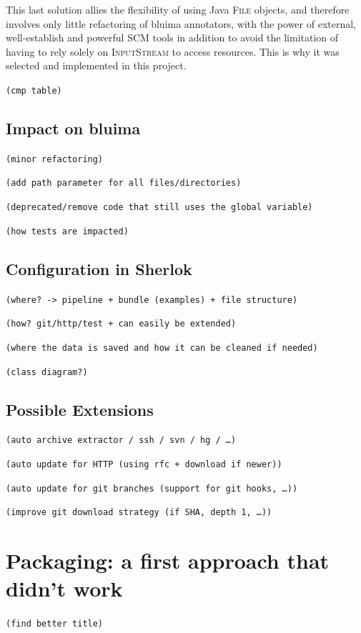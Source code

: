 \documentclass{article}
\newcommand{\ID}[1]{{\textsc{#1}}}
\newcommand{\TODO}[1]{\texttt{\textcolor{YellowOrange}{(#1)}}} %
\begin{document}
This last solution allies the flexibility of using Java \ID{File} objects, and therefore involves
only little refactoring of bluima annotators, with the power of external, well-establish and
powerful SCM tools in addition to avoid the limitation of having to rely solely on \ID{InputStream}
to access resources. This is why it was selected and implemented in this project.

\TODO{cmp table}


\subsection{Impact on bluima}

\TODO{minor refactoring}

\TODO{add path parameter for all files/directories}

\TODO{deprecated/remove code that still uses the global variable}

\TODO{how tests are impacted}

\subsection{Configuration in Sherlok}

\TODO{where? -> pipeline + bundle (examples) + file structure}

\TODO{how? git/http/test + can easily be extended}

\TODO{where the data is saved and how it can be cleaned if needed}

\TODO{class diagram?}

\subsection{Possible Extensions}

\TODO{auto archive extractor / ssh / svn / hg / \dots}

\TODO{auto update for HTTP (using rfc + download if newer)}

\TODO{auto update for git branches (support for git hooks, \dots)}

\TODO{improve git download strategy (if SHA, depth 1, \dots)}

\section{Packaging: a first approach that didn't work}
\label{sec:packaging1}

\TODO{find better title}
\end{document}
